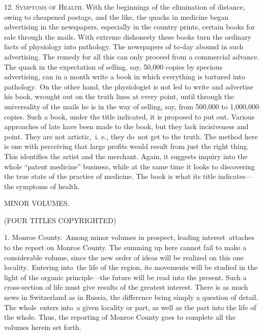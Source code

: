 \documentclass[openany,nobib]{tufte-book}
\begin{document}
12. \textsc{Symptoms of Health}. With the beginnings of the elimination of
distance, owing to cheapened postage, and the like, the quacks in
medicine began advertising in the newspapers, especially in the country
prints, certain books for sale through the mails. With extreme
dishonesty these books turn the ordinary facts of physiology into
pathology. The newspapers of to-day abound in such advertising. The
remedy for all this can only proceed from a commercial advance. The
quack in the expectation of selling, say, 50,000 copies by specious
advertising, can in a month write a book in which everything is tortured
into pathology.~On the other hand, the physiologist is not led to write
and advertise his book, wrought out on the truth lines at every point,
until through the universality of the mails he is in the way of selling,
say, from 500,000 to 1,000,000 copies. Such a book, under the title
indicated, it is proposed to put out. Various approaches of late have
been made to the book, but they lack incisiveness and point. They are
not artistic,~i. e., they do~not get to the truth. The method here is
one with perceiving that large profits would result from just the right
thing. This identifies the artist and the merchant. Again, it suggests
inquiry into the whole ``patent medicine'' business, while at the same
time it looks to discovering the true state of the practice of medicine.
The book is what its title indicates---the symptoms of health.~
\begin{center}

\vspace{.15in}
    
\large{MINOR VOLUMES.}

\vspace{.05in}

\small{(FOUR TITLES COPYRIGHTED)}

\end{center}


1. Monroe County.~Among minor volumes in prospect, leading
  interest~attaches to the report on Monroe County. The summing up here
  cannot fail to make a considerable volume, since the new order of
  ideas will be realized on this one locality.~Entering into~the life of
  the region, its movements will be studied in the light of the organic
  principle---the future will be read into the present. Such a
  cross-section of life must give results of the greatest interest.
  There is as much news in Switzerland as in Russia, the difference
  being simply a question of detail. The whole~enters into~a given
  locality or part, as well as the part into the life of the whole.
  Thus, the reporting of Monroe County goes to complete all the volumes
  herein set forth.~
\end{document}
